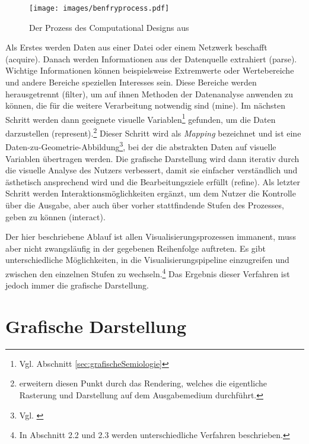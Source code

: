 \documentclass[a4paper, 
               12pt,
               DIV=calc,
               version=first,
               pdftex,
               headsepline,
               footsepline,
               bibliography=totocnumbered,
               listof=numbered]{scrreprt}
\begin{document}
\begin{figure}
\centering
\texttt{[image: images/benfryprocess.pdf]}
\caption{Der Prozess des Computational Designs aus \cite[S.\,13]{BenFry}}
\label{fig:benfryprocess}
\end{figure}
Als Erstes werden Daten aus einer Datei oder einem Netzwerk
beschafft (acquire). Danach werden Informationen aus der Datenquelle extrahiert (parse).
Wichtige Informationen können beispielsweise Extremwerte oder Wertebereiche und andere Bereiche speziellen
Interesses sein.
Diese Bereiche werden herausgetrennt (filter), um auf ihnen Methoden der Datenanalyse anwenden zu können,
die für die weitere Verarbeitung notwendig sind (mine). Im nächsten Schritt werden dann geeignete
visuelle Variablen\footnote{Vgl. Abschnitt \ref{sec:grafischeSemiologie}} gefunden, um die Daten
darzustellen (represent).\footnote{\cite{Schumann} erweitern diesen Punkt durch das Rendering, welches die eigentliche Rasterung
und Darstellung auf dem Ausgabemedium durchführt.}
Dieser Schritt wird als \textit{Mapping} bezeichnet und ist eine
Daten-zu-Geometrie-Abbildung\footnote{Vgl. \citep[S.\,16]{Schumann}}, bei der
die abstrakten Daten auf visuelle Variablen übertragen werden.
Die grafische Darstellung wird dann iterativ durch die visuelle Analyse des Nutzers
verbessert, damit sie einfacher verständlich und ästhetisch ansprechend wird und die Bearbeitungsziele erfüllt (refine). Als letzter
Schritt werden Interaktionsmöglichkeiten ergänzt, um dem Nutzer die Kontrolle über die
Ausgabe, aber auch über vorher stattfindende Stufen des Prozesses, geben zu können (interact).

Der hier beschriebene Ablauf ist allen Visualisierungsprozessen immanent, muss aber nicht zwangsläufig
in der gegebenen Reihenfolge auftreten. Es gibt unterschiedliche Möglichkeiten, in die
Visualisierungspipeline einzugreifen und zwischen den einzelnen Stufen zu wechseln.\footnote{In
\citep{Schumann} Abschnitt 2.2 und 2.3 werden unterschiedliche Verfahren beschrieben.}
Das Ergebnis dieser Verfahren ist jedoch immer die grafische Darstellung.

\section{Grafische Darstellung}
\label{sec:Darstellungen}
\end{document}
